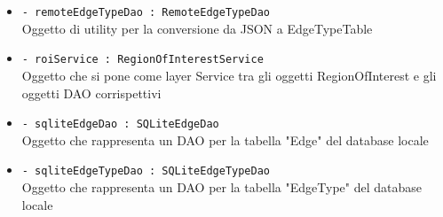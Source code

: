 \documentclass[../DefinizioneDiProdotto.tex]{subfiles}
\begin{document}
\begin{description}
\begin{itemize}
\item \texttt{- remoteEdgeTypeDao : RemoteEdgeTypeDao}\\
Oggetto di utility per la conversione da JSON a EdgeTypeTable

\item \texttt{- roiService : RegionOfInterestService}\\
Oggetto che si pone come layer Service tra gli oggetti RegionOfInterest e gli oggetti DAO corrispettivi

\item \texttt{- sqliteEdgeDao : SQLiteEdgeDao}\\
Oggetto che rappresenta un DAO per la tabella "Edge" del database locale

\item \texttt{- sqliteEdgeTypeDao : SQLiteEdgeTypeDao}\\
Oggetto che rappresenta un DAO per la tabella "EdgeType" del database locale


\end{itemize}
\end{description}
\end{document}
